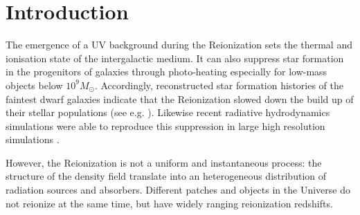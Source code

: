 \documentclass[twocolumn]{aastex61}
\begin{document}


\section{Introduction}
The emergence of a UV background during the Reionization sets the thermal and ionisation state of the intergalactic medium. It can also suppress star formation in the progenitors of galaxies through photo-heating especially for low-mass objects below $10^9 M_\odot$. Accordingly, reconstructed star formation histories of the faintest dwarf galaxies indicate that the Reionization slowed down the build up of their stellar populations (see e.g. \citet{BROWN14}). Likewise recent radiative hydrodynamics simulations were able to reproduce this suppression in large high resolution simulations \citep{OCV16}. 

However, the Reionization is not a uniform and instantaneous process: the structure of the density field translate into an heterogeneous distribution of radiation sources and absorbers. Different patches and objects in the Universe do not reionize at the same time, but have widely ranging reionization redshifts. 
\end{document}
